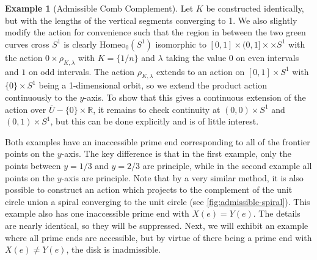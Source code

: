 \documentclass[10pt, oneside]{article}
\newcommand{\R}{\mathbb{R}}
\newcommand{\homeo}[1][S^1]{\text{Homeo}_0(#1)}
\newcommand{\cl}[1]{\overline{#1}}
\theoremstyle{definition}
\newtheorem{eg}{Example}[section]
\theoremstyle{definition}
\begin{document}
\begin{eg}[Admissible Comb Complement]
    Let $K$ be constructed identically, but with the lengths of the vertical segments converging to 1. We also slightly modify the action for convenience such that the region in between the two green curves cross $S^1$ is clearly $\homeo$ isomorphic to $[0, 1]\times (0,1]\times \times S^1$ with the action $0\times \rho_{K, \lambda}$ with $K=\{1/n\}$ and $\lambda$ taking the value $0$ on even intervals and $1$ on odd intervals. The action $\rho_{K, \lambda}$ extends to an action on $[0,1]\times S^1$ with $\{0\}\times S^1$ being a 1-dimensional orbit, so we extend the product action continuously to the $y$-axis. To show that this gives a continuous extension of the action over $\cl{U}-\{0\}\times \R$, it remains to check continuity at $(0,0)\times S^1$ and $(0,1)\times S^1$, but this can be done explicitly and is of little interest.
\end{eg}

Both examples have an inaccessible prime end corresponding to all of the frontier points on the $y$-axis. The key difference is that in the first example, only the points between $y=1/3$ and $y=2/3$ are principle, while in the second example all points on the $y$-axis are principle. Note that by a very similar method, it is also possible to construct an action which projects to the complement of the unit circle union a spiral converging to the unit circle (see \cref{fig:admissible-spiral}). This example also has one inaccessible prime end with $X(e)=Y(e)$. The details are nearly identical, so they will be suppressed. Next, we will exhibit an example where all prime ends are accessible, but by virtue of there being a prime end with $X(e)\neq Y(e)$, the disk is inadmissible.
\end{document}
